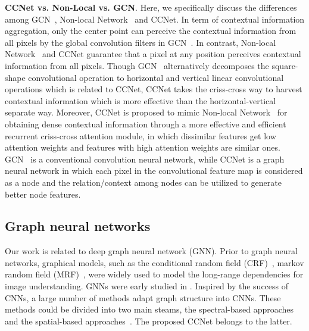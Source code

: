 \documentclass[10pt,journal,compsoc]{IEEEtran}
\begin{document}
\textbf{CCNet vs. Non-Local vs. GCN}.
Here, we specifically discuss the differences among GCN~\cite{peng2017large}, Non-local Network~\cite{wang2018non} and CCNet.
In term of contextual information aggregation, only the center point can perceive the contextual information from all pixels by the global convolution filters in GCN~\cite{peng2017large}. In contrast, Non-local Network~\cite{wang2018non} and CCNet guarantee that a pixel at any position perceives contextual information from all pixels. Though GCN~\cite{peng2017large} alternatively decomposes the square-shape convolutional operation to horizontal and vertical linear convolutional operations which is related to CCNet, CCNet takes the criss-cross way to harvest contextual information which is more effective than the horizontal-vertical separate way. Moreover, CCNet is proposed to mimic Non-local Network~\cite{wang2018non} for obtaining dense contextual information through a more effective and efficient recurrent criss-cross attention module, in which dissimilar features get low attention weights and features with high attention weights are similar ones. GCN~\cite{peng2017large} is a conventional convolution neural network, while CCNet is a graph neural network in which each pixel in the convolutional feature map is considered as a node and the relation/context among nodes can be utilized to generate better node features.

\subsection{Graph neural networks}

Our work is related to deep graph neural network (GNN). Prior to graph neural networks, graphical models, such as the conditional random field (CRF)~\cite{chen2014semantic, zheng2015conditional, huang2018efficient}, markov random field (MRF)~\cite{liu2015semantic}, were widely used to model the long-range dependencies for image understanding. GNNs were early studied in \cite{sperduti1997supervised, gori2005new, scarselli2008graph}. Inspired by the success of CNNs, a large number of methods adapt graph structure into CNNs. These methods could be divided into two main steams, the spectral-based approaches~\cite{henaff2015deep, defferrard2016convolutional, kipf2016semi, levie2018cayleynets} and the spatial-based approaches~\cite{atwood2016diffusion, niepert2016learning, gilmer2017neural, wang2018non}. The proposed CCNet belongs to the latter. 
\end{document}
